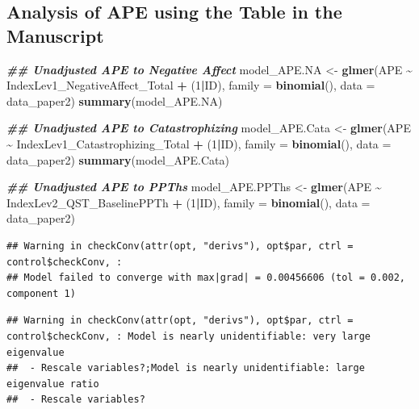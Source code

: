 \documentclass[
  12pt,
]{article}
\newenvironment{Shaded}{\begin{snugshade}}{\end{snugshade}}
\newcommand{\AttributeTok}[1]{\textcolor[rgb]{0.13,0.29,0.53}{#1}}
\newcommand{\DecValTok}[1]{\textcolor[rgb]{0.00,0.00,0.81}{#1}}
\newcommand{\DocumentationTok}[1]{\textcolor[rgb]{0.56,0.35,0.01}{\textbf{\textit{#1}}}}
\newcommand{\FunctionTok}[1]{\textcolor[rgb]{0.13,0.29,0.53}{\textbf{#1}}}
\newcommand{\NormalTok}[1]{#1}
\newcommand{\OtherTok}[1]{\textcolor[rgb]{0.56,0.35,0.01}{#1}}
\newcommand{\SpecialCharTok}[1]{\textcolor[rgb]{0.81,0.36,0.00}{\textbf{#1}}}
\begin{document}
\hypertarget{analysis-of-ape-using-the-table-in-the-manuscript}{%
\subsection{Analysis of APE using the Table in the
Manuscript}\label{analysis-of-ape-using-the-table-in-the-manuscript}}

\begin{Shaded}
\begin{Highlighting}[]
\DocumentationTok{\#\# Unadjusted APE to Negative Affect}
\NormalTok{model\_APE.NA }\OtherTok{\textless{}{-}} \FunctionTok{glmer}\NormalTok{(APE }\SpecialCharTok{\textasciitilde{}}\NormalTok{ IndexLev1\_NegativeAffect\_Total }\SpecialCharTok{+}\NormalTok{ (}\DecValTok{1}\SpecialCharTok{|}\NormalTok{ID), }\AttributeTok{family =} \FunctionTok{binomial}\NormalTok{(), }\AttributeTok{data =}\NormalTok{ data\_paper2)}
\FunctionTok{summary}\NormalTok{(model\_APE.NA)}

 \DocumentationTok{\#\# Unadjusted APE to Catastrophizing}
\NormalTok{model\_APE.Cata }\OtherTok{\textless{}{-}} \FunctionTok{glmer}\NormalTok{(APE }\SpecialCharTok{\textasciitilde{}}\NormalTok{ IndexLev1\_Catastrophizing\_Total }\SpecialCharTok{+}\NormalTok{ (}\DecValTok{1}\SpecialCharTok{|}\NormalTok{ID), }\AttributeTok{family =} \FunctionTok{binomial}\NormalTok{(), }\AttributeTok{data =}\NormalTok{ data\_paper2)}
\FunctionTok{summary}\NormalTok{(model\_APE.Cata)}

\DocumentationTok{\#\# Unadjusted APE to PPThs}
\NormalTok{model\_APE.PPThs }\OtherTok{\textless{}{-}} \FunctionTok{glmer}\NormalTok{(APE }\SpecialCharTok{\textasciitilde{}}\NormalTok{ IndexLev2\_QST\_BaselinePPTh }\SpecialCharTok{+}\NormalTok{ (}\DecValTok{1}\SpecialCharTok{|}\NormalTok{ID), }\AttributeTok{family =} \FunctionTok{binomial}\NormalTok{(), }\AttributeTok{data =}\NormalTok{ data\_paper2)}
\end{Highlighting}
\end{Shaded}

\begin{verbatim}
## Warning in checkConv(attr(opt, "derivs"), opt$par, ctrl = control$checkConv, :
## Model failed to converge with max|grad| = 0.00456606 (tol = 0.002, component 1)
\end{verbatim}

\begin{verbatim}
## Warning in checkConv(attr(opt, "derivs"), opt$par, ctrl = control$checkConv, : Model is nearly unidentifiable: very large eigenvalue
##  - Rescale variables?;Model is nearly unidentifiable: large eigenvalue ratio
##  - Rescale variables?
\end{verbatim}
\end{document}
